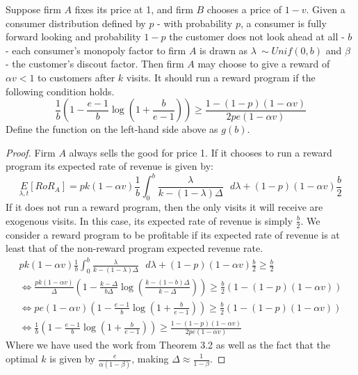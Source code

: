 \begin{theorem}
Suppose firm $A$ fixes its price at 1, and firm $B$ chooses a price of $1-v$. Given a consumer distribution defined by $p$ - with probability $p$, a consumer is fully forward looking and probability $1-p$ the customer does not look ahead at all - $b$ - each consumer's monopoly factor to firm $A$ is drawn as $\lambda~\sim Unif(0,b)$ and $\beta$ - the customer's discout factor. Then firm $A$ may choose to give a reward of $\alpha v < 1$ to customers after $k$ visits. It should run a reward program if the following condition holds.
\begin{equation}
\frac{1}{b}\left(1-\frac{e-1}{b}\log \left(1+\frac{b}{e-1} \right) \right) \geq \frac{1-(1-p)(1-\alpha v)}{2pe(1-\alpha v)}
\end{equation}
Define the function on the left-hand side above as $g(b)$.
\end{theorem}

\begin{proof}
Firm $A$ always sells the good for price 1. If it chooses to run a reward program its expected rate of revenue is given by:
\begin{equation*}
\underset{\lambda, t}E[RoR_A] = pk(1-\alpha v)\frac{1}{b}\int_0^b \frac{\lambda}{k-(1-\lambda)\Delta} \mbox{ } d\lambda + (1-p)(1-\alpha v)\frac{b}{2}
\end{equation*}
If it does not run a reward program, then the only visits it will receive are exogenous visits. In this case, its expected rate of revenue is simply $\frac{b}{2}$. We consider a reward program to be profitable if its expected rate of revenue is at least that of the non-reward program expected revenue rate.
\begin{gather*}
pk(1-\alpha v)\frac{1}{b}\int_0^b \frac{\lambda}{k-(1-\lambda)\Delta} \mbox{ } d\lambda + (1-p)(1-\alpha v)\frac{b}{2} \geq \frac{b}{2} \\
\iff \frac{pk(1-\alpha v)}{\Delta}\left(1-\frac{k-\Delta}{b\Delta}\log \left(\frac{k-(1-b)\Delta}{k-\Delta} \right) \right) \geq \frac{b}{2}(1-(1-p)(1-\alpha v)) \\
\iff pe(1-\alpha v)\left(1-\frac{e-1}{b}\log \left(1+\frac{b}{e-1} \right) \right) \geq \frac{b}{2}(1-(1-p)(1-\alpha v)) \\
\iff \frac{1}{b}\left(1-\frac{e-1}{b}\log \left(1+\frac{b}{e-1} \right) \right) \geq \frac{1-(1-p)(1-\alpha v)}{2pe(1-\alpha v)}
\end{gather*}
Where we have used the work from Theorem 3.2 as well as the fact that the optimal $k$ is given by $\frac{e}{\alpha(1-\beta)}$, making $\Delta \approx \frac{1}{1-\beta}$. 
\end{proof}

